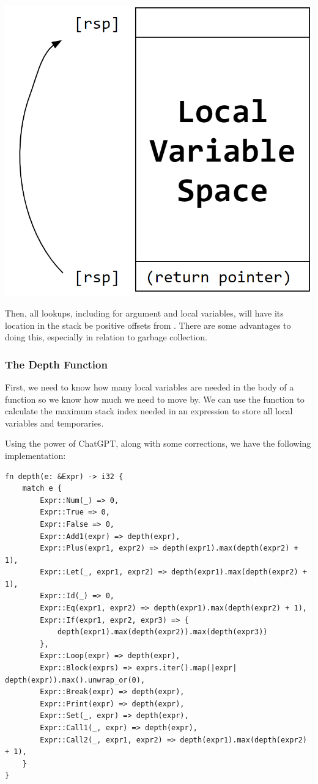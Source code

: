 \documentclass[letterpaper]{article}
\begin{document}
\begin{center}
    \includegraphics[scale=0.3]{../assets/callee_stack_mnged.png}
\end{center}
Then, all lookups, including for argument and local variables, will have its location in the stack be positive offsets from . There are some advantages to doing this, especially in relation to garbage collection.

\subsubsection{The Depth Function}
First, we need to know how many local variables are needed in the body of a function so we know how much we need to move  by. We can use the  function to calculate the maximum stack index needed in an expression to store all local variables and temporaries. 

\bigskip 

Using the power of ChatGPT, along with some corrections, we have the following implementation:
\begin{verbatim}
fn depth(e: &Expr) -> i32 {
    match e {
        Expr::Num(_) => 0,
        Expr::True => 0,
        Expr::False => 0,
        Expr::Add1(expr) => depth(expr),
        Expr::Plus(expr1, expr2) => depth(expr1).max(depth(expr2) + 1),
        Expr::Let(_, expr1, expr2) => depth(expr1).max(depth(expr2) + 1),
        Expr::Id(_) => 0,
        Expr::Eq(expr1, expr2) => depth(expr1).max(depth(expr2) + 1),
        Expr::If(expr1, expr2, expr3) => {
            depth(expr1).max(depth(expr2)).max(depth(expr3))
        },
        Expr::Loop(expr) => depth(expr),
        Expr::Block(exprs) => exprs.iter().map(|expr| depth(expr)).max().unwrap_or(0),
        Expr::Break(expr) => depth(expr),
        Expr::Print(expr) => depth(expr),
        Expr::Set(_, expr) => depth(expr),
        Expr::Call1(_, expr) => depth(expr),
        Expr::Call2(_, expr1, expr2) => depth(expr1).max(depth(expr2) + 1),
    }
}\end{verbatim}
\end{document}
